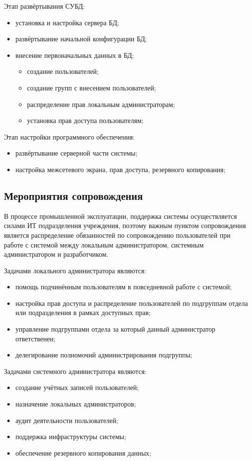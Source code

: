 \documentclass[utf8,usehyperref,12pt]{G7-32}
\begin{document}
Этап развёртывания СУБД:
\begin{itemize}
 \item установка и настройка сервера БД;
 \item развёртывание начальной конфигурации БД;
 \item внесение первоначальных данных в БД;
 	\begin{itemize}
 	 \item создание пользователей;
 	 \item создание групп с внесением пользователей;
 	 \item распределение прав локальным администраторам;
 	 \item установка прав доступа пользователям;
 	\end{itemize}
\end{itemize}

Этап настройки программного обеспечения:
\begin{itemize}
 \item развёртывание серверной части системы;
 \item настройка межсетевого экрана, прав доступа, резервного копирования;
\end{itemize}

\subsection{Мероприятия сопровождения}

В процессе промышленной эксплуатации, поддержка системы осуществляется силами ИТ подразделения учреждения, поэтому важным пунктом сопровождения является распределение обязанностей по сопровождению пользователей при работе с системой между локальным администратором, системным администратором и разработчиком. 

Задачами локального администратора являются: 
\begin{itemize}
 \item помощь подчинённым пользователям в повседневной работе с системой;
 \item настройка прав доступа и распределение пользователей по подгруппам отдела или подразделения в рамках доступных прав;
 \item управление подгруппами отдела за который данный администратор ответственен;
 \item делегирование полномочий администрирования подгруппы;
\end{itemize}

Задачами системного администратора являются:
\begin{itemize}
 \item создание учётных записей пользователей;
 \item назначение локальных администраторов;
 \item аудит деятельности пользователей;
 \item поддержка инфраструктуры системы;
 \item обеспечение резервного копирования данных;
\end{itemize}
\end{document}
